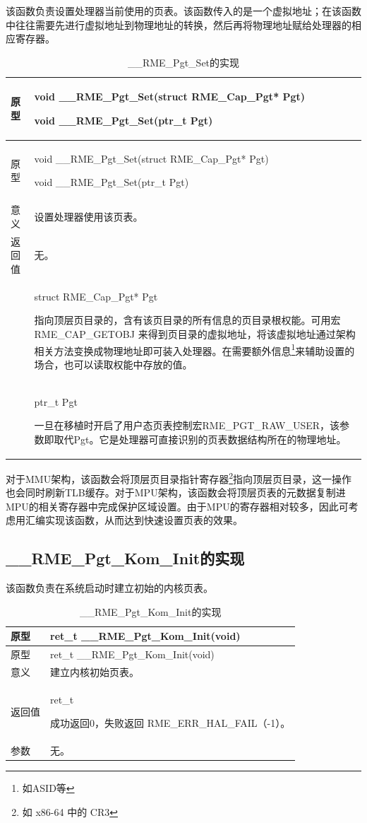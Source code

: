 该函数负责设置处理器当前使用的页表。该函数传入的是一个虚拟地址；在该函数中往往需要先进行虚拟地址到物理地址的转换，然后再将物理地址赋给处理器的相应寄存器。

\begin{xltabular}{\textwidth}{@{}>{\hsize\raggedright\arraybackslash}X>{\hsize\raggedright\arraybackslash}X@{}}
\caption{\_\_RME\_Pgt\_Set的实现}\label{tab:7-74-rme-pgt-set-implementation}\\
\toprule
原型\strut
 & void \_\_RME\_Pgt\_Set(struct RME\_Cap\_Pgt* Pgt)

void \_\_RME\_Pgt\_Set(ptr\_t Pgt)\strut
\tabularnewline
\endfirsthead
\toprule
原型\strut
 & void \_\_RME\_Pgt\_Set(struct RME\_Cap\_Pgt* Pgt)

void \_\_RME\_Pgt\_Set(ptr\_t Pgt)\strut
\tabularnewline
\midrule
\endhead
\bottomrule
\endlastfoot
意义 & 设置处理器使用该页表。\tabularnewline
返回值 & 无。\tabularnewline
{} & struct RME\_Cap\_Pgt* Pgt

指向顶层页目录的，含有该页目录的所有信息的页目录根权能。可用宏 RME\_CAP\_GETOBJ 来得到页目录的虚拟地址，将该虚拟地址通过架构相关方法变换成物理地址即可装入处理器。在需要额外信息\footnote{如ASID等}来辅助设置的场合，也可以读取权能中存放的值。\strut
\tabularnewline
\strut
 & ptr\_t Pgt

一旦在移植时开启了用户态页表控制宏RME\_PGT\_RAW\_USER，该参数即取代Pgt。它是处理器可直接识别的页表数据结构所在的物理地址。\strut
\tabularnewline
\end{xltabular}

对于MMU架构，该函数会将顶层页目录指针寄存器\footnote{如 x86-64 中的 CR3}指向顶层页目录，这一操作也会同时刷新TLB缓存。对于MPU架构，该函数会将顶层页表的元数据复制进MPU的相关寄存器中完成保护区域设置。由于MPU的寄存器相对较多，因此可考虑用汇编实现该函数，从而达到快速设置页表的效果。

\subsection{\_\_RME\_Pgt\_Kom\_Init的实现}\label{subsec:7-rme-pgt-kom-init-implementation}

该函数负责在系统启动时建立初始的内核页表。

\begin{xltabular}{\textwidth}{@{}>{\hsize\raggedright\arraybackslash}X>{\hsize\raggedright\arraybackslash}X@{}}
\caption{\_\_RME\_Pgt\_Kom\_Init的实现}\label{tab:7-75-rme-pgt-kom-init-implementation}\\
\toprule
原型 & ret\_t \_\_RME\_Pgt\_Kom\_Init(void)\tabularnewline
\endfirsthead
\toprule
原型 & ret\_t \_\_RME\_Pgt\_Kom\_Init(void)\tabularnewline
\midrule
\endhead
\bottomrule
\endlastfoot
意义 & 建立内核初始页表。\tabularnewline
返回值\strut
 & ret\_t

成功返回0，失败返回 RME\_ERR\_HAL\_FAIL（-1）。\strut
\tabularnewline
参数 & 无。\tabularnewline
\end{xltabular}

